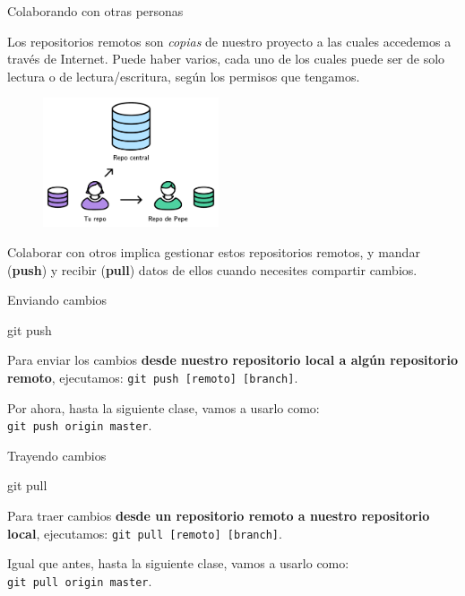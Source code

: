 \begin{frame}{Colaborando con otras personas}

    Los repositorios remotos son \textit{copias} de nuestro proyecto a las cuales accedemos a través
    de Internet. Puede haber varios, cada uno de los cuales
    puede ser de solo lectura o de lectura/escritura, según los permisos que tengamos.

    \begin{figure}[ht]
        \begin{center}
            \includegraphics[height=1.5in]{images/repo-remoto.pdf}
        \end{center}
    \end{figure}

    Colaborar con otros implica gestionar estos repositorios remotos, y mandar (\textbf{push}) y recibir (\textbf{pull})
    datos de ellos cuando necesites compartir cambios.

\end{frame}

\begin{frame}[t]{Enviando cambios}
    \begin{comando}
        git push
    \end{comando}

    \pause
    \begin{block}{}
        Para enviar los cambios \textbf{desde nuestro repositorio local a algún
        repositorio remoto}, ejecutamos: \texttt{git push [remoto] [branch]}.

        \vspace{0.5em}

        Por ahora, hasta la siguiente clase, vamos a usarlo como:\\ \texttt{git push origin master}.
    \end{block}
\end{frame}

\begin{frame}[t]{Trayendo cambios}
    \begin{comando}
        git pull
    \end{comando}

    \pause
    \begin{block}{}
        Para traer cambios \textbf{desde un repositorio remoto a nuestro repositorio local},
        ejecutamos: \texttt{git pull [remoto] [branch]}.

        \vspace{0.5em}

        Igual que antes, hasta la siguiente clase, vamos a usarlo como:\\ \texttt{git pull origin master}.
    \end{block}
\end{frame}

